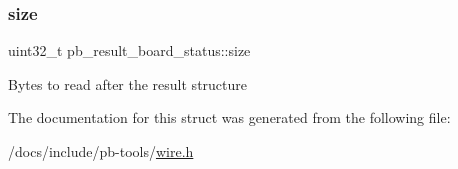 \subsubsection{\texorpdfstring{size}{size}}
{\footnotesize\ttfamily uint32\+\_\+t pb\+\_\+result\+\_\+board\+\_\+status\+::size}

Bytes to read after the result structure 

The documentation for this struct was generated from the following file\+:\begin{DoxyCompactItemize}
\item 
/docs/include/pb-\/tools/\hyperlink{wire_8h}{wire.\+h}\end{DoxyCompactItemize}
